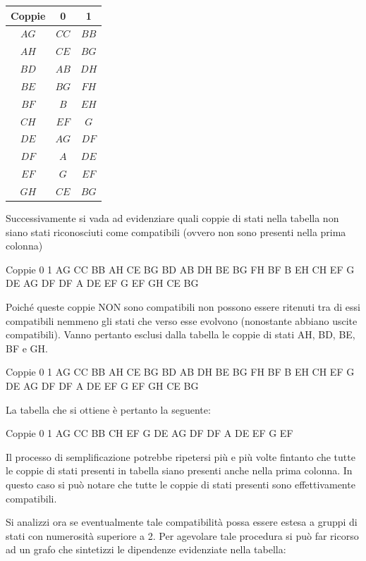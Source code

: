 \documentclass[a4paper]{extarticle}
\renewcommand\arraystretch{}
\begin{document}
\vspace{1em}
\noindent
\begin{table}[H]
\setlength{\tabcolsep}{4pt}
\renewcommand{\arraystretch}{1.2}
\centering
\begin{tabular}{c|cc}
    \textbf{Coppie} & \textbf{0} & \textbf{1}\\
    \hline
    $AG$ & $CC$ & $BB$\\
    $AH$ & $CE$ & $BG$\\
    $BD$ & $AB$ & $DH$\\
    $BE$ & $BG$ & $FH$\\
    $BF$ & $B$  & $EH$\\
    $CH$ & $EF$ & $G$\\
    $DE$ & $AG$ & $DF$\\
    $DF$ & $A$  & $DE$\\
    $EF$ & $G$  & $EF$\\
    $GH$ & $CE$ & $BG$
\end{tabular}
\end{table}



Successivamente si vada ad evidenziare quali coppie di stati nella tabella non siano stati riconosciuti come compatibili (ovvero non sono presenti nella prima colonna)


Coppie
0
1
AG
CC
BB
AH
CE
BG
BD
AB
DH
BE
BG
FH
BF
B 
EH
CH
EF
G
DE
AG
DF
DF
A
DE
EF
G
EF
GH
CE
BG


Poiché queste coppie NON sono compatibili non possono essere ritenuti tra di essi compatibili nemmeno gli stati che verso esse evolvono (nonostante abbiano uscite compatibili). Vanno pertanto esclusi dalla tabella le coppie di stati AH, BD, BE, BF e GH.

Coppie
0
1
AG
CC
BB
AH
CE
BG
BD
AB
DH
BE
BG
FH
BF
B 
EH
CH
EF
G
DE
AG
DF
DF
A
DE
EF
G
EF
GH
CE
BG


La tabella che si ottiene è pertanto la seguente:

Coppie
0
1
AG
CC
BB
CH
EF
G
DE
AG
DF
DF
A
DE
EF
G
EF


Il processo di semplificazione potrebbe ripetersi più e più volte fintanto che tutte le coppie di stati presenti in tabella siano presenti anche nella prima colonna. In questo caso si può notare che tutte le coppie di stati presenti sono effettivamente compatibili.

Si analizzi ora se eventualmente tale compatibilità possa essere estesa a gruppi di stati con numerosità superiore a 2. Per agevolare tale procedura si può far ricorso ad un grafo che sintetizzi le dipendenze evidenziate nella tabella:
\end{document}
